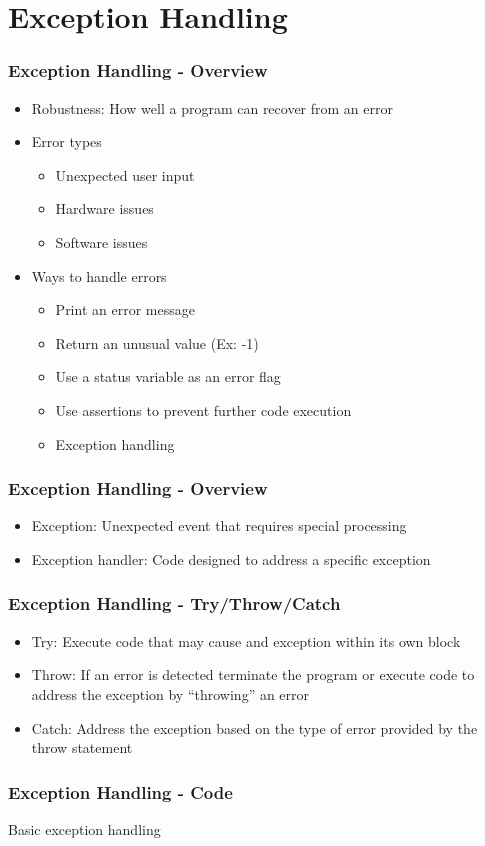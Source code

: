 \section{Exception Handling}
\begin{frame}\frametitle{Exception Handling - Overview}
\begin{itemize}
\item Robustness: How well a program can recover from an error
\item Error types
	\begin{itemize}
	\item Unexpected user input
	\item Hardware issues
	\item Software issues
	\end{itemize}
\item Ways to handle errors
	\begin{itemize}
	\item Print an error message
	\item Return an unusual value (Ex: -1)
	\item Use a status variable as an error flag
	\item Use assertions to prevent further code execution
	\item Exception handling
	\end{itemize}
\end{itemize}
\end{frame}

\begin{frame}\frametitle{Exception Handling - Overview}
\begin{itemize}
\item Exception: Unexpected event that requires special processing
\item Exception handler: Code designed to address a specific exception
\end{itemize}
\end{frame}

\begin{frame}\frametitle{Exception Handling - Try/Throw/Catch}
\begin{itemize}
\item Try: Execute code that may cause and exception within its own block
\item Throw: If an error is detected terminate the program or execute code to address the exception by ``throwing'' an error
\item Catch: Address the exception based on the type of error provided by the throw statement
\end{itemize}
\end{frame}

\begin{frame}\frametitle{Exception Handling - Code}
Basic exception handling

\end{frame}

